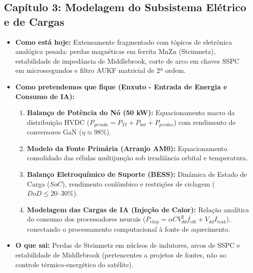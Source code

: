 \documentclass[11pt,a4paper]{article}
\begin{document}
\subsection*{Capítulo 3: Modelagem do Subsistema Elétrico e de Cargas}
\begin{itemize}[leftmargin=1.2em, itemsep=2pt, parsep=0pt]
    \item \textbf{Como está hoje:} Extensamente fragmentado com tópicos de eletrônica analógica pesada: perdas magnéticas em ferrita MnZn (Steinmetz), estabilidade de impedância de Middlebrook, corte de arco em chaves SSPC em microssegundos e filtro AUKF matricial de 2ª ordem.
    \item \textbf{Como pretendemos que fique (Enxuto - Entrada de Energia e Consumo de IA):}
    \begin{enumerate}[label=\alph*., itemsep=1pt, parsep=0pt]
        \item \textbf{Balanço de Potência do Nó (50 kW):} Equacionamento macro da distribuição HVDC ($P_{gerada} = P_{TI} + P_{bat} + P_{perdas}$) com rendimento de conversores GaN ($\eta \approx 98\%$).
        \item \textbf{Modelo da Fonte Primária (Arranjo AM0):} Equacionamento consolidado das células multijunção sob irradiância orbital e temperatura.
        \item \textbf{Balanço Eletroquímico de Suporte (BESS):} Dinâmica de Estado de Carga ($SoC$), rendimento coulômbico e restrições de ciclagem ($DoD \le 20\text{--}30\%$).
        \item \textbf{Modelagem das Cargas de IA (Injeção de Calor):} Relação analítica do consumo dos processadores neurais ($P_{chip} = \alpha C V_{dd}^2 f_{clk} + V_{dd} I_{leak}$), conectando o processamento computacional à fonte de aquecimento.
    \end{enumerate}
    \item \textbf{O que sai:} Perdas de Steinmetz em núcleos de indutores, arcos de SSPC e estabilidade de Middlebrook (pertencentes a projetos de fontes, não ao controle térmico-energético do satélite).
\end{itemize}

\vspace{4pt}
\end{document}
